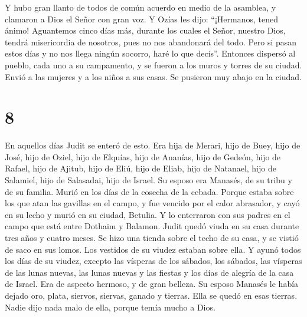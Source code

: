  Y hubo gran llanto de todos de común acuerdo en medio de
la asamblea, y clamaron a Dios el Señor con gran voz.  Y
Ozías les dijo: ``¡Hermanos, tened ánimo! Aguantemos cinco días más,
durante los cuales el Señor, nuestro Dios, tendrá misericordia de
nosotros, pues no nos abandonará del todo.  Pero si pasan
estos días y no nos llega ningún socorro, haré lo que decís''.
 Entonces dispersó al pueblo, cada uno a su campamento, y
se fueron a los muros y torres de su ciudad. Envió a las mujeres y a los
niños a sus casas. Se pusieron muy abajo en la ciudad.

\hypertarget{section-7}{%
\section{8}\label{section-7}}

 En aquellos días Judit se enteró de esto. Era hija de
Merari, hijo de Buey, hijo de José, hijo de Oziel, hijo de Elquías, hijo
de Ananías, hijo de Gedeón, hijo de Rafael, hijo de Ajitub, hijo de
Eliú, hijo de Eliab, hijo de Natanael, hijo de Salamiel, hijo de
Salasadai, hijo de Israel.  Su esposo era Manasés, de su
tribu y de su familia. Murió en los días de la cosecha de la cebada.
 Porque estaba sobre los que atan las gavillas en el
campo, y fue vencido por el calor abrasador, y cayó en su lecho y murió
en su ciudad, Betulia. Y lo enterraron con sus padres en el campo que
está entre Dothaim y Balamon.  Judit quedó viuda en su
casa durante tres años y cuatro meses.  Se hizo una tienda
sobre el techo de su casa, y se vistió de saco en sus lomos. Los
vestidos de su viudez estaban sobre ella.  Y ayunó todos
los días de su viudez, excepto las vísperas de los sábados, los sábados,
las vísperas de las lunas nuevas, las lunas nuevas y las fiestas y los
días de alegría de la casa de Israel.  Era de aspecto
hermoso, y de gran belleza. Su esposo Manasés le había dejado oro,
plata, siervos, siervas, ganado y tierras. Ella se quedó en esas
tierras.  Nadie dijo nada malo de ella, porque temía mucho
a Dios.

